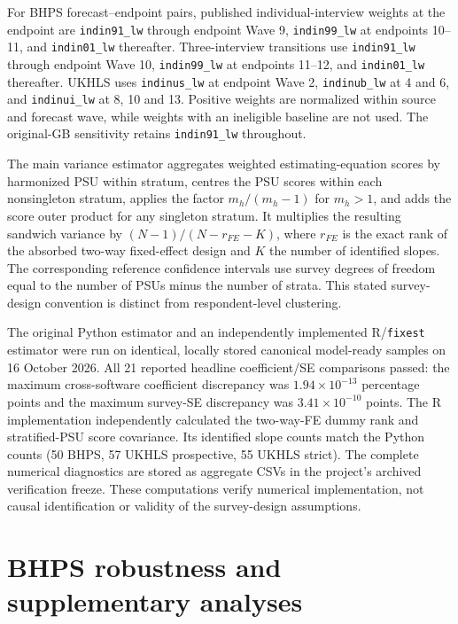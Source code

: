 For BHPS forecast--endpoint pairs, published individual-interview weights at the endpoint are \texttt{indin91\_lw} through endpoint Wave 9, \texttt{indin99\_lw} at endpoints 10--11, and \texttt{indin01\_lw} thereafter. Three-interview transitions use \texttt{indin91\_lw} through endpoint Wave 10, \texttt{indin99\_lw} at endpoints 11--12, and \texttt{indin01\_lw} thereafter. UKHLS uses \texttt{indinus\_lw} at endpoint Wave 2, \texttt{indinub\_lw} at 4 and 6, and \texttt{indinui\_lw} at 8, 10 and 13. Positive weights are normalized within source and forecast wave, while weights with an ineligible baseline are not used. The original-GB sensitivity retains \texttt{indin91\_lw} throughout.

The main variance estimator aggregates weighted estimating-equation scores by harmonized PSU within stratum, centres the PSU scores within each nonsingleton stratum, applies the factor $m_h/(m_h-1)$ for $m_h>1$, and adds the score outer product for any singleton stratum. It multiplies the resulting sandwich variance by $(N-1)/(N-r_{FE}-K)$, where $r_{FE}$ is the exact rank of the absorbed two-way fixed-effect design and $K$ the number of identified slopes. The corresponding reference confidence intervals use survey degrees of freedom equal to the number of PSUs minus the number of strata. This stated survey-design convention is distinct from respondent-level clustering.

The original Python estimator and an independently implemented R/\texttt{fixest} estimator were run on identical, locally stored canonical model-ready samples on 16 October 2026. All 21 reported headline coefficient/SE comparisons passed: the maximum cross-software coefficient discrepancy was $1.94\times10^{-13}$ percentage points and the maximum survey-SE discrepancy was $3.41\times10^{-10}$ points. The R implementation independently calculated the two-way-FE dummy rank and stratified-PSU score covariance. Its identified slope counts match the Python counts (50 BHPS, 57 UKHLS prospective, 55 UKHLS strict). The complete numerical diagnostics are stored as aggregate CSVs in the project's archived verification freeze. These computations verify numerical implementation, not causal identification or validity of the survey-design assumptions.

\section{BHPS robustness and supplementary analyses}\label{sec:robustness}


